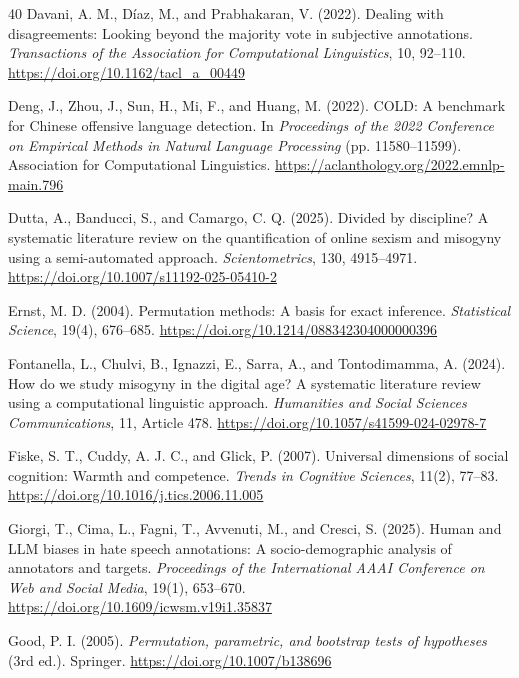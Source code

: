 \documentclass[a4paper,fleqn,review]{cas-sc}
\begin{document}
\begin{thebibliography}{40}
Davani, A. M., D\'iaz, M., and Prabhakaran, V. (2022).
Dealing with disagreements: Looking beyond the majority vote in subjective annotations.
\emph{Transactions of the Association for Computational Linguistics}, 10, 92--110.
\url{https://doi.org/10.1162/tacl_a_00449}

Deng, J., Zhou, J., Sun, H., Mi, F., and Huang, M. (2022).
COLD: A benchmark for Chinese offensive language detection.
In \emph{Proceedings of the 2022 Conference on Empirical Methods in Natural Language Processing} (pp. 11580--11599).
Association for Computational Linguistics.
\url{https://aclanthology.org/2022.emnlp-main.796}

Dutta, A., Banducci, S., and Camargo, C. Q. (2025).
Divided by discipline? A systematic literature review on the quantification of online sexism and misogyny using a semi-automated approach.
\emph{Scientometrics}, 130, 4915--4971.
\url{https://doi.org/10.1007/s11192-025-05410-2}

Ernst, M. D. (2004).
Permutation methods: A basis for exact inference.
\emph{Statistical Science}, 19(4), 676--685.
\url{https://doi.org/10.1214/088342304000000396}

Fontanella, L., Chulvi, B., Ignazzi, E., Sarra, A., and Tontodimamma, A. (2024).
How do we study misogyny in the digital age? A systematic literature review using a computational linguistic approach.
\emph{Humanities and Social Sciences Communications}, 11, Article 478.
\url{https://doi.org/10.1057/s41599-024-02978-7}

Fiske, S. T., Cuddy, A. J. C., and Glick, P. (2007).
Universal dimensions of social cognition: Warmth and competence.
\emph{Trends in Cognitive Sciences}, 11(2), 77--83.
\url{https://doi.org/10.1016/j.tics.2006.11.005}

Giorgi, T., Cima, L., Fagni, T., Avvenuti, M., and Cresci, S. (2025).
Human and LLM biases in hate speech annotations: A socio-demographic analysis of annotators and targets.
\emph{Proceedings of the International AAAI Conference on Web and Social Media}, 19(1), 653--670.
\url{https://doi.org/10.1609/icwsm.v19i1.35837}

Good, P. I. (2005).
\emph{Permutation, parametric, and bootstrap tests of hypotheses} (3rd ed.).
Springer.
\url{https://doi.org/10.1007/b138696}


\end{thebibliography}
\end{document}
